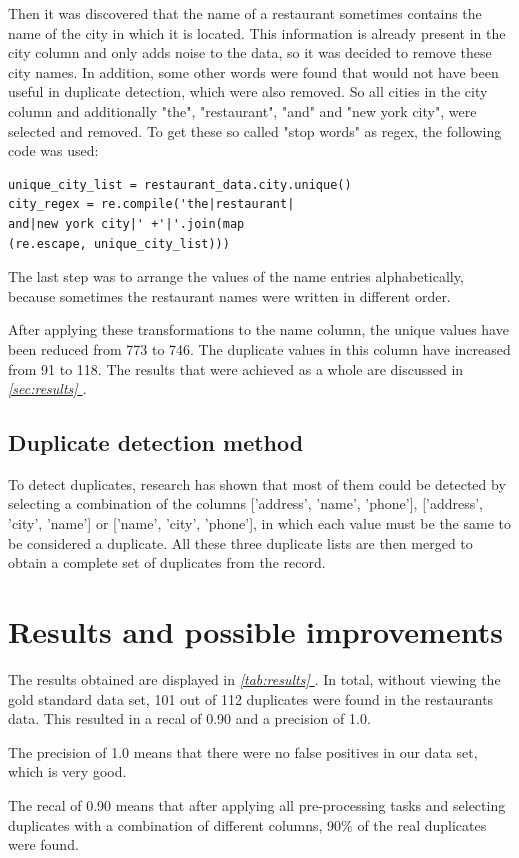 \documentclass[conference]{IEEEtran}
\newcommand*{\fullref}[1]{\textit{\hyperref[{#1}]{\autoref*{#1} \nameref*{#1}}}}
\begin{document}
Then it was discovered that the name of a restaurant sometimes contains the name of the city in which it is located. This information is already present in the city column and only adds noise to the data, so it was decided to remove these city names. In addition, some other words were found that would not have been useful in duplicate detection, which were also removed. So all cities in the city column and additionally "the", "restaurant", "and" and "new york city", were selected and removed. To get these so called "stop words" as regex, the following code was used: 
\begin{lstlisting}
unique_city_list = restaurant_data.city.unique()
city_regex = re.compile('the|restaurant|
and|new york city|' +'|'.join(map
(re.escape, unique_city_list)))
\end{lstlisting}
The last step was to arrange the values of the name entries alphabetically, because sometimes the restaurant names were written in different order. 

After applying these transformations to the name column, the unique values have been reduced from 773 to 746. The duplicate values in this column have increased from 91 to 118. The results that were achieved as a whole are discussed in \fullref{sec:results}.
\subsection{Duplicate detection method} \label{sec:dup_detection_method}
To detect duplicates, research has shown that most of them could be detected by selecting a combination of the columns ['address', 'name', 'phone'], ['address', 'city', 'name'] or ['name', 'city', 'phone'], in which each value must be the same to be considered a duplicate. All these three duplicate lists are then merged to obtain a complete set of duplicates from the record.
\section{Results and possible improvements}\label{sec:results}
The results obtained are displayed in \fullref{tab:results}. In total, without viewing the gold standard data set, 101 out of 112 duplicates were found in the restaurants data. This resulted in a recal of 0.90 and a precision of 1.0. 

The precision of 1.0 means that there were no false positives in our data set, which is very good. 

The recal of 0.90 means that after applying all pre-processing tasks and selecting duplicates with a combination of different columns, 90\% of the real duplicates were found.
\end{document}

